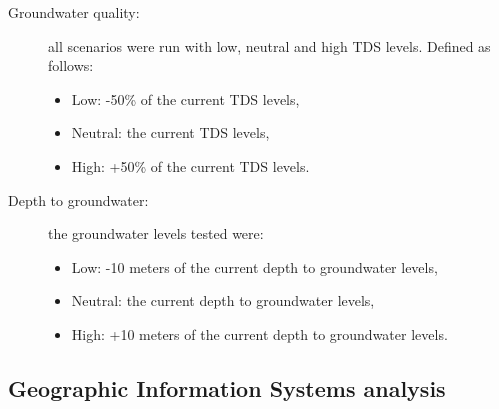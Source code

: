 \begin{description}
	\item[Groundwater quality:] all scenarios were run with low, neutral and high TDS levels. Defined as follows:
	\begin{itemize}
		\item Low: -50\% of the current TDS levels,
		\item Neutral: the current TDS levels,
		\item High: +50\% of the current TDS levels.
	\end{itemize}
	\item[Depth to groundwater:] the groundwater levels tested were:
	\begin{itemize}
		\item Low: -10 meters of the current depth to groundwater levels,
		\item Neutral: the current depth to groundwater levels,
		\item High: +10 meters of the current depth to groundwater levels.
	\end{itemize}
\end{description}

\subsection{Geographic Information Systems analysis}

